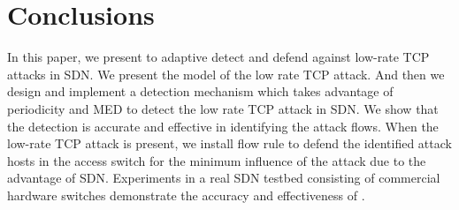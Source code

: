 
\section{Conclusions}
In this paper, we present \TheName to adaptive detect and defend against low-rate TCP attacks in SDN. We present the model of the low rate TCP attack. And then we design and implement a detection mechanism which takes advantage of periodicity and MED to detect the low rate TCP attack in SDN. We show that the detection is accurate and effective in identifying the attack flows. When the low-rate TCP attack is present, we install flow rule to defend the identified attack hosts in the access switch for the minimum influence of the attack due to the advantage of SDN. Experiments in a real SDN testbed consisting of commercial hardware switches demonstrate the accuracy and effectiveness of \TheName{}.
